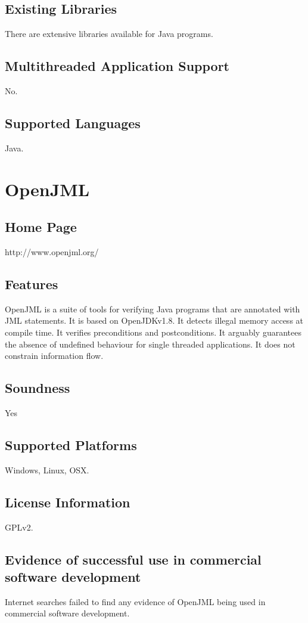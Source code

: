 \documentclass[12pt,openany,a4paper]{book}
\begin{document}
	\subsection{Existing Libraries} 
		There are extensive libraries available for Java programs.
	\subsection{Multithreaded Application Support} 
		No.
	\subsection{Supported Languages} 
		Java.	










\section{OpenJML}
	\subsection{Home Page}%
	http://www.openjml.org/
	\subsection{Features}
	OpenJML is a suite of tools for verifying Java programs that are annotated with JML statements. It is based on OpenJDKv1.8. It detects illegal memory access at compile time. It verifies preconditions and postconditions. It arguably guarantees the absence of undefined behaviour for single threaded applications. It does not constrain information flow.
	
	\subsection{Soundness}
	Yes
	\subsection{Supported Platforms}
	Windows, Linux, OSX.
	\subsection{License Information}
		GPLv2.
	\subsection{Evidence of successful use in commercial software development} 
		Internet searches failed to find any evidence of OpenJML being used in commercial software development. 
\end{document}
